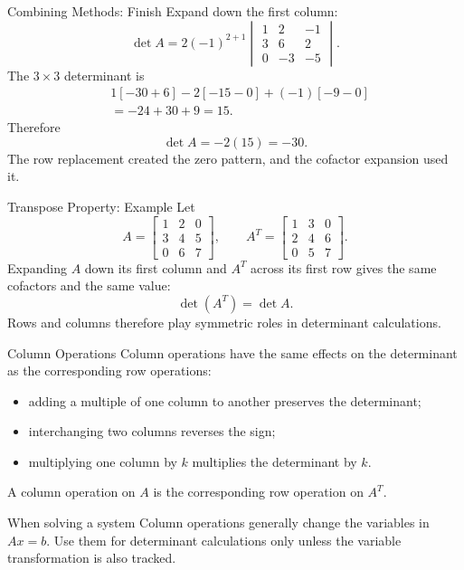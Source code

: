 \begin{frame}{Combining Methods: Finish}
Expand down the first column:
\[
\det A
=2(-1)^{2+1}
\begin{vmatrix}
1&2&-1\\
3&6&2\\
0&-3&-5
\end{vmatrix}.
\]
\pause
The $3\times3$ determinant is
\begin{align*}
&1[-30+6]-2[-15-0]+(-1)[-9-0]\\
&=-24+30+9=15.
\end{align*}
Therefore
\[
\boxed{\det A=-2(15)=-30}.
\]
The row replacement created the zero pattern, and the cofactor expansion used it.
\end{frame}

\begin{frame}{Transpose Property: Example}
Let
\[
A=\begin{bmatrix}1&2&0\\3&4&5\\0&6&7\end{bmatrix},
\qquad
A^T=\begin{bmatrix}1&3&0\\2&4&6\\0&5&7\end{bmatrix}.
\]
Expanding $A$ down its first column and $A^T$ across its first row gives the same cofactors and the same value:
\[
\boxed{\det(A^T)=\det A}.
\]
\pause
Rows and columns therefore play symmetric roles in determinant calculations.
\end{frame}

\begin{frame}{Column Operations}
Column operations have the same effects on the determinant as the corresponding row operations:
\begin{itemize}
  \item adding a multiple of one column to another preserves the determinant;
  \item interchanging two columns reverses the sign;
  \item multiplying one column by $k$ multiplies the determinant by $k$.
\end{itemize}
\pause
A column operation on $A$ is the corresponding row operation on $A^T$.
\begin{alertblock}{When solving a system}
Column operations generally change the variables in $Ax=b$. Use them for determinant calculations only unless the variable transformation is also tracked.
\end{alertblock}
\end{frame}


